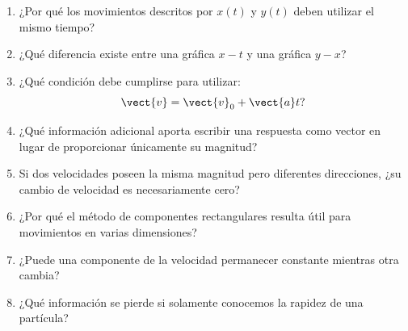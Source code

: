 \begin{enumerate}
    \item ¿Por qué los movimientos descritos por \(x(t)\) y \(y(t)\) deben utilizar
    el mismo tiempo?

    \item ¿Qué diferencia existe entre una gráfica \(x-t\) y una gráfica \(y-x\)?

    \item ¿Qué condición debe cumplirse para utilizar:
    \[
    \vect{v}=\vect{v}_0+\vect{a}t?
    \]

    \item ¿Qué información adicional aporta escribir una respuesta como vector en
    lugar de proporcionar únicamente su magnitud?

    \item Si dos velocidades poseen la misma magnitud pero diferentes direcciones,
    ¿su cambio de velocidad es necesariamente cero?

    \item ¿Por qué el método de componentes rectangulares resulta útil para
    movimientos en varias dimensiones?

    \item ¿Puede una componente de la velocidad permanecer constante mientras otra
    cambia?

    \item ¿Qué información se pierde si solamente conocemos la rapidez de una
    partícula?
\end{enumerate}


